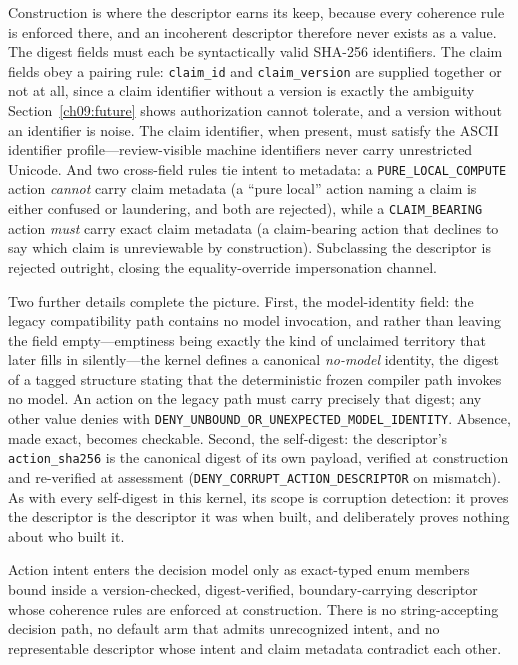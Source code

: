 Construction is where the descriptor earns its keep, because every coherence rule is enforced there, and an incoherent descriptor therefore never exists as a value. The digest fields must each be syntactically valid SHA-256 identifiers. The claim fields obey a pairing rule: \texttt{claim\_id} and \texttt{claim\_version} are supplied together or not at all, since a claim identifier without a version is exactly the ambiguity Section~\ref{ch09:future} shows authorization cannot tolerate, and a version without an identifier is noise. The claim identifier, when present, must satisfy the ASCII identifier profile---review-visible machine identifiers never carry unrestricted Unicode. And two cross-field rules tie intent to metadata: a \texttt{PURE\_LOCAL\_COMPUTE} action \emph{cannot} carry claim metadata (a ``pure local'' action naming a claim is either confused or laundering, and both are rejected), while a \texttt{CLAIM\_BEARING} action \emph{must} carry exact claim metadata (a claim-bearing action that declines to say which claim is unreviewable by construction). Subclassing the descriptor is rejected outright, closing the equality-override impersonation channel.

Two further details complete the picture. First, the model-identity field: the legacy compatibility path contains no model invocation, and rather than leaving the field empty---emptiness being exactly the kind of unclaimed territory that later fills in silently---the kernel defines a canonical \emph{no-model} identity, the digest of a tagged structure stating that the deterministic frozen compiler path invokes no model. An action on the legacy path must carry precisely that digest; any other value denies with \texttt{DENY\_UNBOUND\_OR\_UNEXPECTED\_MODEL\_IDENTITY}. Absence, made exact, becomes checkable. Second, the self-digest: the descriptor's \texttt{action\_sha256} is the canonical digest of its own payload, verified at construction and re-verified at assessment (\texttt{DENY\_CORRUPT\_ACTION\_DESCRIPTOR} on mismatch). As with every self-digest in this kernel, its scope is corruption detection: it proves the descriptor is the descriptor it was when built, and deliberately proves nothing about who built it.

\begin{ruleenv}\label{ch09:rule:typed-actions}
Action intent enters the decision model only as exact-typed enum members bound inside a version-checked, digest-verified, boundary-carrying descriptor whose coherence rules are enforced at construction. There is no string-accepting decision path, no default arm that admits unrecognized intent, and no representable descriptor whose intent and claim metadata contradict each other.
\end{ruleenv}

